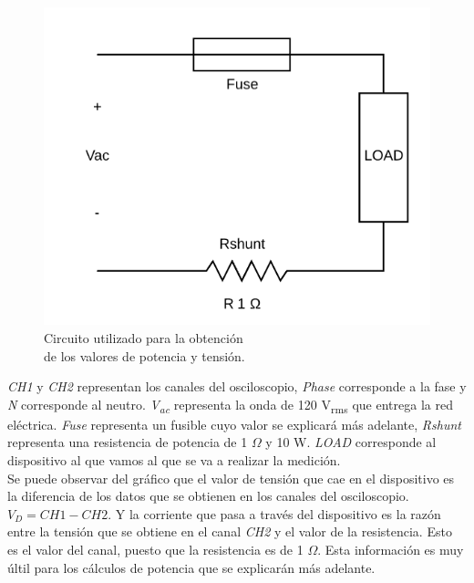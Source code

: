 \documentclass[journal]{IEEEtran}
\begin{document}
\begin{figure}[h]
\centering
\includegraphics[clip,width=0.75\columnwidth]{circuit_diagram.png}
\caption{Circuito utilizado para la obtención \\
de los valores de potencia y tensión.}
\label{circuit_diagram}
\end{figure}

\textit{CH1} y
\textit{CH2} representan los canales del osciloscopio,
\textit{Phase} corresponde a la fase y \textit{N} corresponde
al neutro. \textit{V\textsubscript{ac}} representa 
la onda de 120 
V\textsubscript{rms} que entrega la red eléctrica. 
\textit{Fuse} representa un fusible cuyo valor se explicará 
más adelante, \textit{Rshunt} representa una resistencia 
de potencia de 1 $\Omega$ y 10 W. \textit{LOAD} corresponde
al dispositivo al que vamos al que se va a realizar la
medición.\\ 

Se puede observar del
gráfico que el valor de tensión que cae en el dispositivo
es la diferencia de los datos que se obtienen en los canales 
del osciloscopio. $V_D = CH1 - CH2$. Y la corriente que 
pasa a través del dispositivo es la razón entre la tensión 
que se obtiene en el canal \textit{CH2} y el valor de la 
resistencia. Esto es el valor del canal, puesto que 
la resistencia es de 1 $\Omega$. Esta información es muy
últil para los cálculos de potencia que se explicarán más 
adelante.\\

\end{document}

